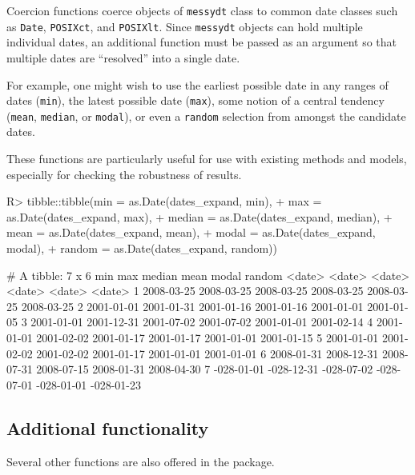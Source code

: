 \documentclass[
]{jss}
\begin{document}
Coercion functions coerce objects of \texttt{messydt} class to common
date classes such as \texttt{Date}, \texttt{POSIXct}, and
\texttt{POSIXlt}. Since \texttt{messydt} objects can hold multiple
individual dates, an additional function must be passed as an argument
so that multiple dates are ``resolved'' into a single date.

For example, one might wish to use the earliest possible date in any
ranges of dates (\texttt{min}), the latest possible date (\texttt{max}),
some notion of a central tendency (\texttt{mean}, \texttt{median}, or
\texttt{modal}), or even a \texttt{random} selection from amongst the
candidate dates.

These functions are particularly useful for use with existing methods
and models, especially for checking the robustness of results.

\begin{CodeChunk}
\begin{CodeInput}
R> tibble::tibble(min = as.Date(dates_expand, min),
+                max = as.Date(dates_expand, max),
+                median = as.Date(dates_expand, median),
+                mean = as.Date(dates_expand, mean),
+                modal = as.Date(dates_expand, modal),
+                random = as.Date(dates_expand, random))
\end{CodeInput}
\begin{CodeOutput}
# A tibble: 7 x 6
  min        max        median     mean       modal      random    
  <date>     <date>     <date>     <date>     <date>     <date>    
1 2008-03-25 2008-03-25 2008-03-25 2008-03-25 2008-03-25 2008-03-25
2 2001-01-01 2001-01-31 2001-01-16 2001-01-16 2001-01-01 2001-01-05
3 2001-01-01 2001-12-31 2001-07-02 2001-07-02 2001-01-01 2001-02-14
4 2001-01-01 2001-02-02 2001-01-17 2001-01-17 2001-01-01 2001-01-15
5 2001-01-01 2001-02-02 2001-02-02 2001-01-17 2001-01-01 2001-01-01
6 2008-01-31 2008-12-31 2008-07-31 2008-07-15 2008-01-31 2008-04-30
7 -028-01-01 -028-12-31 -028-07-02 -028-07-01 -028-01-01 -028-01-23
\end{CodeOutput}
\end{CodeChunk}

\hypertarget{additional-functionality}{%
\subsection{Additional functionality}\label{additional-functionality}}

Several other functions are also offered in the 
package.
\end{document}
